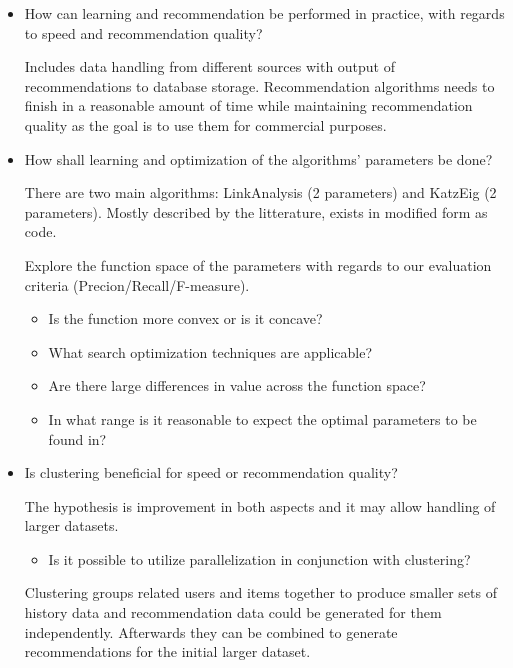 \documentclass[11pt]{article}
\begin{document}
\begin{itemize}

    \item How can learning and recommendation be performed in practice, with regards to speed and recommendation quality?

          Includes data handling from different sources with output of recommendations to database storage. Recommendation algorithms needs to finish in a reasonable amount of time while maintaining recommendation quality as the goal is to use them for commercial purposes.


    \item How shall learning and optimization of the algorithms' parameters be done?

          There are two main algorithms: LinkAnalysis (2 parameters) and KatzEig (2 parameters). Mostly described by the litterature, exists in modified form as code.

          Explore the function space of the parameters with regards to our evaluation criteria (Precion/Recall/F-measure).

          \begin{itemize}
                \item Is the function more convex or is it concave? 
                \item What search optimization techniques are applicable?
                \item Are there large differences in value across the function space?
                \item In what range is it reasonable to expect the optimal parameters to be found in?
          \end{itemize}


    \item Is clustering beneficial for speed or recommendation quality?

          The hypothesis is improvement in both aspects and it may allow handling of larger datasets.

          \begin{itemize}
                \item Is it possible to utilize parallelization in conjunction with clustering?
          \end{itemize}

          Clustering groups related users and items together to produce smaller sets of history data and recommendation data could be generated for them independently. Afterwards they can be combined to generate recommendations for the initial larger dataset.

\end{itemize}
\end{document}
